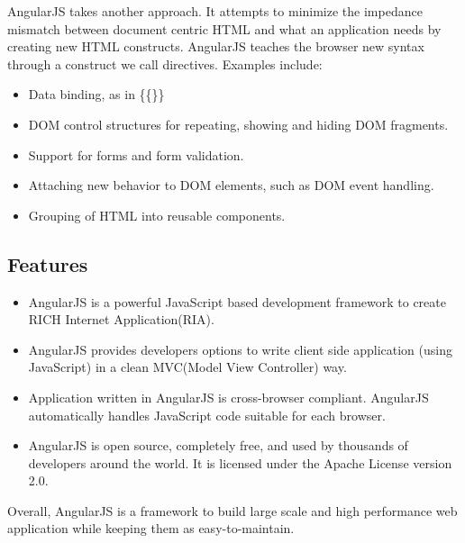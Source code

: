 \documentclass[12pt]{article}
\begin{document}
	AngularJS takes another approach. It attempts to minimize the impedance mismatch between document centric HTML and what an application needs by creating new HTML constructs. AngularJS teaches the browser new syntax through a construct we call directives. Examples include:
	\begin{itemize}
		\item Data binding, as in \colorbox{mygray}{\{\{\}\}}
		\item DOM control structures for repeating, showing and hiding DOM fragments.
		\item Support for forms and form validation.
		\item Attaching new behavior to DOM elements, such as DOM event handling.
		\item Grouping of HTML into reusable components.	
	\end{itemize}
	\subsection{Features}
	\begin{itemize}
		\item AngularJS is a powerful JavaScript based development framework to create RICH Internet Application(RIA).
		\item  AngularJS provides developers options to write client side application (using JavaScript) in a clean MVC(Model View Controller) way.
		\item  Application written in AngularJS is cross-browser compliant. AngularJS automatically handles JavaScript code suitable for each browser.
		\item AngularJS is open source, completely free, and used by thousands of developers around the world. It is licensed under the Apache License version 2.0.
	\end{itemize}
		Overall, AngularJS is a framework to build large scale and high performance web application while keeping them as easy-to-maintain.
\end{document}
